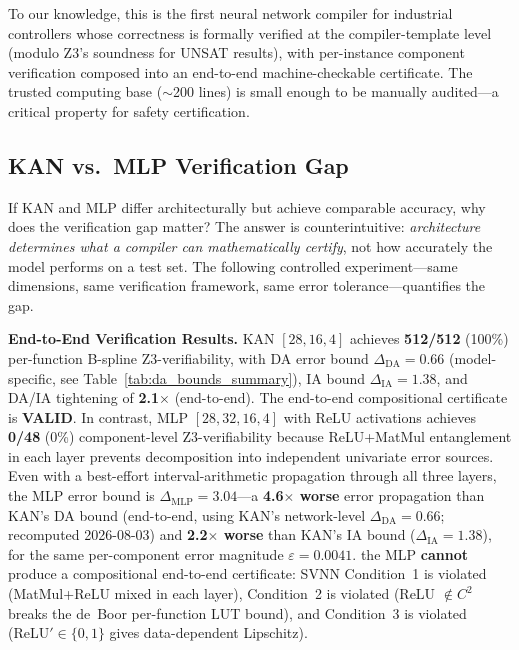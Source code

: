 \documentclass[journal,onecolumn]{IEEEtran}
\begin{document}
To our knowledge, this is the first neural network compiler for
industrial controllers whose correctness is formally verified at
the compiler-template level (modulo Z3's soundness for UNSAT results),
with per-instance component verification
composed into an end-to-end machine-checkable certificate. The
trusted computing base ($\sim$200 lines) is small enough to be
manually audited---a critical property for safety certification.

\subsection{KAN vs.\ MLP Verification Gap}
\label{sec:verify_gap}

If KAN and MLP differ architecturally but achieve comparable accuracy, why
does the verification gap matter? The answer is counterintuitive:
\textit{architecture determines what a compiler can mathematically certify},
not how accurately the model performs on a test set. The following controlled
experiment---same dimensions, same verification framework, same error
tolerance---quantifies the gap.

\vspace{4pt}
\noindent\textbf{End-to-End Verification Results.}
KAN $[28,16,4]$ achieves \textbf{512/512} (100\%) per-function B-spline
Z3-verifiability, with DA error bound $\Delta_{\text{DA}} = 0.66$ (model-specific,
see Table~\ref{tab:da_bounds_summary}), IA bound $\Delta_{\text{IA}} = 1.38$,
and DA/IA tightening of \textbf{2.1$\times$} (end-to-end).
The end-to-end compositional certificate is \textbf{VALID}. In contrast,
MLP $[28,32,16,4]$ with ReLU activations achieves \textbf{0/48} (0\%)
component-level Z3-verifiability because ReLU+MatMul entanglement in each
layer prevents decomposition into independent univariate error sources.
Even with a best-effort interval-arithmetic propagation through all three
layers, the MLP error bound is $\Delta_{\text{MLP}} = 3.04$---a
\textbf{4.6$\times$ worse} error propagation than KAN's DA bound
(end-to-end, using KAN's network-level $\Delta_{\text{DA}}{=}0.66$;
recomputed 2026-08-03) and
\textbf{2.2$\times$ worse} than KAN's IA bound ($\Delta_{\text{IA}} = 1.38$),
for the same per-component error magnitude $\varepsilon = 0.0041$.
the MLP \textbf{cannot} produce a compositional end-to-end certificate:
SVNN Condition~1 is violated (MatMul+ReLU mixed in each layer), Condition~2
is violated (ReLU $\notin C^2$ breaks the de~Boor per-function LUT bound),
and Condition~3 is violated (ReLU$' \in \{0,1\}$ gives data-dependent
Lipschitz).
\end{document}
